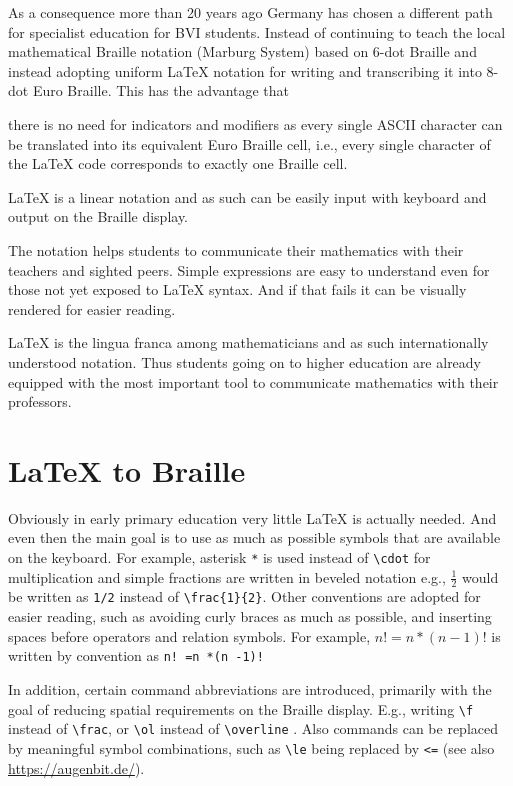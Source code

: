 \documentclass{article}
\begin{document}
As a consequence more than 20 years ago Germany has chosen a different path for
specialist education for BVI students. Instead of continuing to teach the local
mathematical Braille notation (Marburg System) based on 6-dot Braille and instead
adopting uniform {\LaTeX} notation for writing and transcribing it into 8-dot
Euro Braille. This has the advantage that 
\begin{inparaenum}[(1)]
\item there is no need for indicators and
  modifiers as every single ASCII character can be translated into its equivalent
  Euro Braille cell, i.e., every single character of the {\LaTeX} code corresponds
  to exactly one Braille cell.
\item {\LaTeX} is a linear notation and as such can be easily input with
  keyboard and output on the Braille display.
\item The notation helps students to communicate their mathematics with their
  teachers and sighted peers. Simple expressions are easy to understand even for
  those not yet exposed to {\LaTeX} syntax. And if that fails it can be visually
  rendered for easier reading.
\item {\LaTeX} is the lingua franca among mathematicians and as such
  internationally understood notation. Thus students going on to higher
  education are already equipped with the most important tool to communicate
  mathematics with their professors.
\end{inparaenum}


\section{{\LaTeX} to Braille}\label{sec:latex-to-braille}

Obviously in early primary education very little {\LaTeX} is actually
needed. And even then the main goal is to use as much as possible symbols that are
available on the keyboard. For example, asterisk \texttt{*} is used instead of
\verb+\cdot+ for multiplication and simple fractions are written in beveled
notation e.g., $\frac{1}{2}$ would be written as \texttt{1/2} instead of
\verb+\frac{1}{2}+. Other conventions are adopted for easier reading, such as
avoiding curly braces as much as possible, and inserting spaces before operators
and relation symbols. For example, ${ n! = n*(n-1)! }$ is written by convention
as \verb+n! =n *(n -1)!+

In addition, certain command abbreviations are introduced, primarily with the
goal of reducing spatial requirements on the Braille display. E.g., writing
\verb+\f+ instead of \verb+\frac+, or \verb+\ol+ instead of \verb+\overline+
. Also commands can be replaced by meaningful symbol combinations, such as
\verb+\le+ being replaced by \verb+<=+  (see also \url{https://augenbit.de/}).
\end{document}
